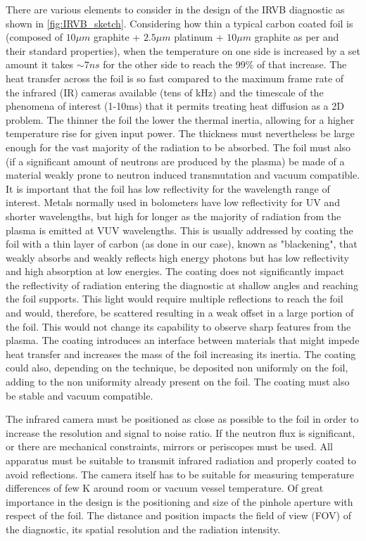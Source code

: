 There are various elements to consider in the design of the IRVB diagnostic as shown in \autoref{fig:IRVB_sketch}.
Considering how thin a typical carbon coated foil is (composed of $10\mu m$ graphite + $2.5\mu m$ platinum + $10\mu m$ graphite as per \cite{Pandya2014} and their standard properties), when the temperature on one side is increased by a set amount it takes $\sim7ns$ for the other side to reach the 99\% of that increase. The heat transfer across the foil is so fast compared to the maximum frame rate of the infrared (IR) cameras available (tens of kHz) and the timescale of the phenomena of interest (1-10ms) that it permits treating heat diffusion as a 2D problem. The thinner the foil the lower the thermal inertia, allowing for a higher temperature rise for given input power. The thickness must nevertheless be large enough for the vast majority of the radiation to be absorbed. The foil must also (if a significant amount of neutrons are produced by the plasma) be made of a material weakly prone to neutron induced transmutation and vacuum compatible.\cite{Mukai2021}
It is important that the foil has low reflectivity for the wavelength range of interest. Metals normally used in bolometers have low reflectivity for UV and shorter wavelengths, but high for longer as the majority of radiation from the plasma is emitted at VUV wavelengths. This is usually addressed by coating the foil with a thin layer of carbon (as done in our case), known as "blackening", that weakly absorbs and weakly reflects high energy photons but has low reflectivity and high absorption at low energies. The coating does not significantly impact the reflectivity of radiation entering the diagnostic at shallow angles and reaching the foil supports.\cite{Gullikson2022} This light would require multiple reflections to reach the foil and would, therefore, be scattered resulting in a weak offset in a large portion of the foil. This would not change its capability to observe sharp features from the plasma. The coating introduces an interface between materials that might impede heat transfer and increases the mass of the foil increasing its inertia. The coating could also, depending on the technique, be deposited non uniformly on the foil, adding to the non uniformity already present on the foil. The coating must also be stable and vacuum compatible. \cite{Mukai2016}

The infrared camera must be positioned as close as possible to the foil in order to increase the resolution and signal to noise ratio. If the neutron flux is significant, or there are mechanical constraints, mirrors or periscopes must be used. All apparatus must be suitable to transmit infrared radiation and properly coated to avoid reflections. The camera itself has to be suitable for measuring temperature differences of few K around room or vacuum vessel temperature.
Of great importance in the design is the positioning and size of the pinhole aperture with respect of the foil. The distance and position impacts the field of view (FOV) of the diagnostic, its spatial resolution and the radiation intensity.

